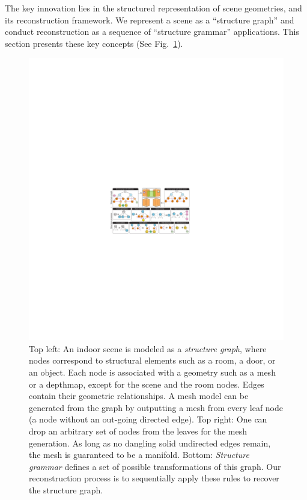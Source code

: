 The key innovation lies in the structured representation of scene
geometries, and its reconstruction framework. We represent a scene as a
``structure graph'' and conduct reconstruction as a
sequence of ``structure grammar'' applications. This section presents
these key concepts (See Fig.~\ref{fig:graph_grammar}).

\begin{figure}[tb]
\begin{center}
 \includegraphics[width=165mm]{../figures/grammar.pdf}
 \end{center}
 \caption{Top
 left: An indoor scene is modeled as a {\em structure graph}, where
 nodes correspond to structural elements such as a room, a door, or an
 object. Each node is associated with a geometry such as a mesh or a
 depthmap, except for the scene and the room nodes. Edges contain their
 geometric relationships. A mesh model can be generated from the graph
 by outputting a mesh from every leaf node (a node without an out-going
 directed edge). Top right: One can drop an arbitrary set of nodes from
 the leaves for the mesh generation. As long as no dangling solid
 undirected edges remain, the mesh is guaranteed to be a
 manifold. Bottom: {\em Structure grammar} defines a set of possible
 transformations of this graph. Our reconstruction process is
 to sequentially apply these rules to recover the structure graph.}
 \label{fig:graph_grammar}
 \vspace{-0.325cm}
\end{figure}

